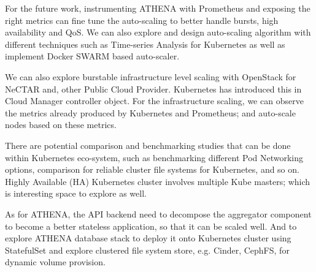 For the future work, instrumenting ATHENA with Prometheus and exposing the right metrics can fine tune the auto-scaling to better handle bursts, high availability and QoS. We can also explore and design auto-scaling algorithm with different techniques such as Time-series Analysis for Kubernetes as well as implement Docker SWARM based auto-scaler.

We can also explore burstable infrastructure level scaling with OpenStack for NeCTAR and, other Public Cloud Provider. Kubernetes has introduced this in Cloud Manager controller object. For the infrastructure scaling, we can observe the metrics already produced by Kubernetes and Prometheus; and auto-scale nodes based on these metrics.

There are potential comparison and benchmarking studies that can be done within Kubernetes eco-system, such as benchmarking different Pod Networking options, comparison for reliable cluster file systems for Kubernetes, and so on. Highly Available (HA) Kubernetes cluster involves multiple Kube masters; which is interesting space to explore as well.

As for ATHENA, the API backend need to decompose the aggregator component to become a better stateless application, so that it can be scaled well. And to explore ATHENA database stack to deploy it onto Kubernetes cluster using StatefulSet and explore clustered file system store, e.g. Cinder, CephFS, for dynamic volume provision.
